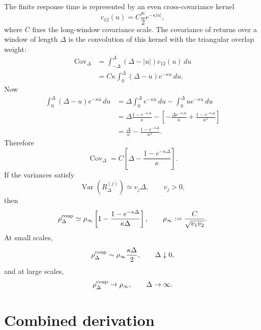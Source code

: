 \documentclass[5p,final]{elsarticle}
\begin{document}
The finite response time is represented by an even cross-covariance kernel
\begin{equation}
c_{12}(u)=C\frac{\kappa}{2}e^{-\kappa|u|},
\label{eq:exp-cov-kernel}
\end{equation}
where $C$ fixes the long-window covariance scale.  The covariance of returns over a window of length $\Delta$ is the convolution of this kernel with the triangular overlap weight:
\begin{align}
\operatorname{Cov}_\Delta
&=\int_{-\Delta}^{\Delta}(\Delta-|u|)c_{12}(u)\,du\\
&=C\kappa\int_0^\Delta(\Delta-u)e^{-\kappa u}\,du.
\end{align}
Now
\begin{align}
\int_0^\Delta(\Delta-u)e^{-\kappa u}\,du
&=\Delta\int_0^\Delta e^{-\kappa u}\,du
-\int_0^\Delta ue^{-\kappa u}\,du\nonumber\\
&=\Delta\frac{1-e^{-\kappa\Delta}}{\kappa}
-\left[-\frac{\Delta e^{-\kappa\Delta}}{\kappa}
+\frac{1-e^{-\kappa\Delta}}{\kappa^2}\right]\nonumber\\
&=\frac{\Delta}{\kappa}-\frac{1-e^{-\kappa\Delta}}{\kappa^2}.
\end{align}
Therefore
\begin{equation}
\operatorname{Cov}_\Delta
=C\left[\Delta-\frac{1-e^{-\kappa\Delta}}{\kappa}\right].
\end{equation}
If the variances satisfy
\begin{equation}
\operatorname{Var}(R^{(j)}_\Delta)\simeq v_j\Delta,
\qquad v_j>0,
\end{equation}
then
\begin{equation}
\rho^{\rm coup}_\Delta
\simeq
\rho_\infty
\left[1-\frac{1-e^{-\kappa\Delta}}{\kappa\Delta}\right],
\qquad
\rho_\infty:=\frac{C}{\sqrt{v_1v_2}}.
\label{eq:coup-final}
\end{equation}
At small scales,
\begin{equation}
\rho^{\rm coup}_\Delta
\sim \rho_\infty\frac{\kappa\Delta}{2},
\qquad \Delta\downarrow0,
\end{equation}
and at large scales,
\begin{equation}
\rho^{\rm coup}_\Delta\to \rho_\infty,
\qquad \Delta\to\infty.
\end{equation}

\section{Combined derivation}\label{app:combined-subordination-coupling}
\end{document}
